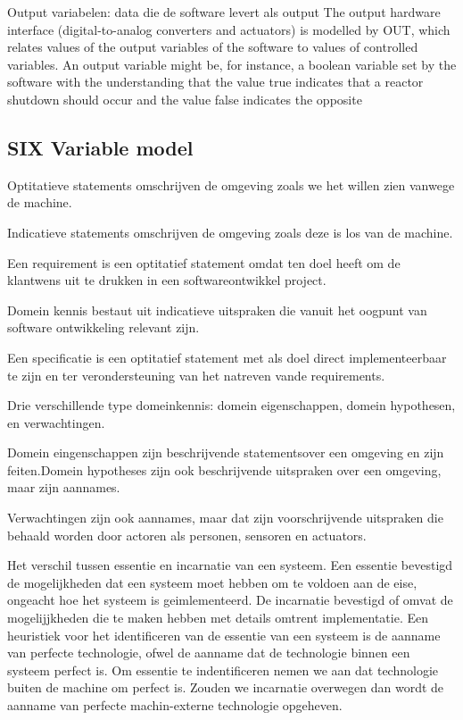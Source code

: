 Output variabelen: data die de software levert als output
The output hardware interface (digital-to-analog converters and actuators) is modelled
by OUT, which relates values of the output variables of the software to values of controlled variables. An output variable might be, for instance, a boolean variable set by the software with the
understanding that the value true indicates that a reactor shutdown should occur and the value
false indicates the opposite



\subsection{SIX Variable model}
Optitatieve statements omschrijven de omgeving zoals we het willen zien vanwege de machine. 

Indicatieve statements omschrijven de omgeving zoals deze is los van de machine. 

Een requirement is een optitatief statement omdat ten doel heeft om de klantwens uit te drukken in een softwareontwikkel project. 

Domein kennis bestaut uit indicatieve uitspraken die vanuit het oogpunt van software ontwikkeling relevant zijn. 

Een specificatie is een optitatief statement met als doel direct implementeerbaar te zijn en ter verondersteuning van het natreven vande requirements. 

Drie verschillende type domeinkennis: domein eigenschappen, domein hypothesen, en verwachtingen. 

Domein eingenschappen  zijn beschrijvende statementsover een omgeving en zijn feiten.Domein hypotheses  zijn ook beschrijvende uitspraken over een omgeving, maar zijn aannames. 

Verwachtingen zijn ook aannames, maar dat zijn voorschrijvende uitspraken die behaald worden door actoren als personen, sensoren en actuators. 

Het verschil tussen essentie en incarnatie van een systeem. Een essentie bevestigd de  mogelijkheden dat een systeem moet hebben om te voldoen aan de eise, ongeacht hoe het systeem is geimlementeerd. De incarnatie bevestigd of omvat de mogelijjkheden die te maken hebben met details omtrent implementatie. Een heuristiek voor het identificeren van de essentie van een systeem is de aanname van perfecte technologie, ofwel de aanname dat de technologie binnen een systeem perfect is. Om essentie te indentificeren nemen we aan dat technologie buiten de machine om perfect is. Zouden we incarnatie overwegen dan wordt de aanname van perfecte machin-externe technologie opgeheven. 

